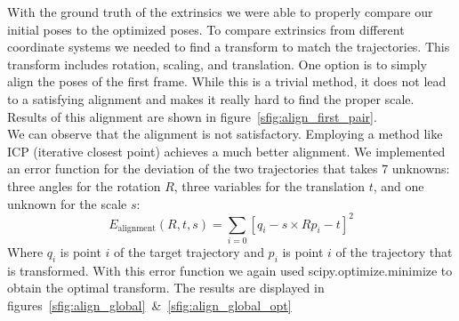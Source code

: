         With the ground truth of the extrinsics we were able to properly compare our initial poses to the optimized poses.
        To compare extrinsics from different coordinate systems we needed to find a transform to match the trajectories.
        This transform includes rotation, scaling, and translation.
        One option is to simply align the poses of the first frame.
        While this is a trivial method, it does not lead to a satisfying alignment and makes it really hard to find the proper scale.
        Results of this alignment are shown in figure~\ref{sfig:align_first_pair}.\\
        We can observe that the alignment is not satisfactory.
        Employing a method like ICP (iterative closest point) achieves a much better alignment.
        We implemented an error function for the deviation of the two trajectories that takes 7 unknowns: three angles for the rotation $R$, three variables for the translation $t$, and one unknown for the scale $s$:
        \begin{equation*}
            E_{\text{alignment}}(R,t,s) =
            \sum_{i=0} \left[
                q_i - s \times Rp_i - t
            \right]^2
            \label{eq:ealign}
        \end{equation*}
        Where $q_i$ is point $i$ of the target trajectory and $p_i$ is point $i$ of the trajectory that is transformed.
        With this error function we again used scipy.optimize.minimize to obtain the optimal transform.
        The results are displayed in figures~\ref{sfig:align_global}~\&~\ref{sfig:align_global_opt}\\
